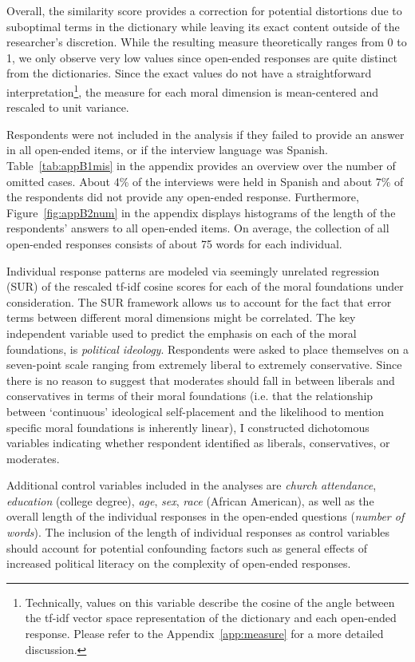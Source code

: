 \documentclass[12pt]{article}
\begin{document}
Overall, the similarity score provides a correction for potential distortions due to suboptimal terms in the dictionary while leaving its exact content outside of the researcher's discretion. While the resulting measure theoretically ranges from 0 to 1, we only observe very low values since open-ended responses are quite distinct from the dictionaries. Since the exact values do not have a straightforward interpretation\footnote{Technically, values on this variable describe the cosine of the angle between the tf-idf vector space representation of the dictionary and each open-ended response. Please refer to the Appendix~\ref{app:measure} for a more detailed discussion.}, the measure for each moral dimension is mean-centered and rescaled to unit variance.

Respondents were not included in the analysis if they failed to provide an answer in all open-ended items, or if the interview language was Spanish. Table~\ref{tab:appB1mis} in the appendix provides an overview over the number of omitted cases. About 4\% of the interviews were held in Spanish and about 7\% of the respondents did not provide any open-ended response. Furthermore, Figure~\ref{fig:appB2num} in the appendix displays histograms of the length of the respondents' answers to all open-ended items. On average, the collection of all open-ended responses consists of about 75 words for each individual.

Individual response patterns are modeled via seemingly unrelated regression (SUR) of the rescaled tf-idf cosine scores for each of the moral foundations under consideration. The SUR framework allows us to account for the fact that error terms between different moral dimensions might be correlated. The key independent variable used to predict the emphasis on each of the moral foundations, is \textit{political ideology}. Respondents were asked to place themselves on a seven-point scale ranging from extremely liberal to extremely conservative. Since there is no reason to suggest that moderates should fall in between liberals and conservatives in terms of their moral foundations (i.e. that the relationship between `continuous' ideological self-placement and the likelihood to mention specific moral foundations is inherently linear), I constructed dichotomous variables indicating whether respondent identified as liberals, conservatives, or moderates.

Additional control variables included in the analyses are \textit{church attendance}, \textit{education} (college degree), \textit{age}, \textit{sex}, \textit{race} (African American), as well as the overall length of the individual responses in the open-ended questions (\textit{number of words}). The inclusion of the length of individual responses as control variables should account for potential confounding factors such as general effects of increased political literacy on the complexity of open-ended responses.
\end{document}
